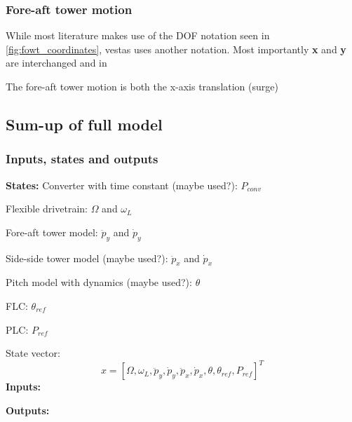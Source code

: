 \subsubsection{Fore-aft tower motion}
While most literature makes use of the DOF notation seen in \cref{fig:fowt_coordinates}, vestas uses another notation. Most importantly \textbf{x} and \textbf{y} are interchanged and in

The fore-aft tower motion is both the x-axis translation (surge) 

%	

\subsection{Sum-up of full model}

\subsubsection{Inputs, states and outputs}
\textbf{States:}
Converter with time constant (maybe used?): $ P_{conv} $

Flexible drivetrain: $ \Omega $ and $ \omega_L $

Fore-aft tower model: $ \ddot{p}_y $ and $ \dot{p}_y $

Side-side tower model (maybe used?): $ \ddot{p}_x $ and $ \dot{p}_x $

Pitch model with dynamics (maybe used?): $ \theta $

FLC: $ \theta_{ref} $

PLC: $ P_{ref} $

State vector: 
\begin{equation}\label{key}
	x = [\Omega, \omega_L, \ddot{p}_y, \dot{p}_y, \ddot{p}_x, \dot{p}_x, \theta, \theta_{ref}, P_{ref}]^T
\end{equation}
\textbf{Inputs:}


\textbf{Outputs:}